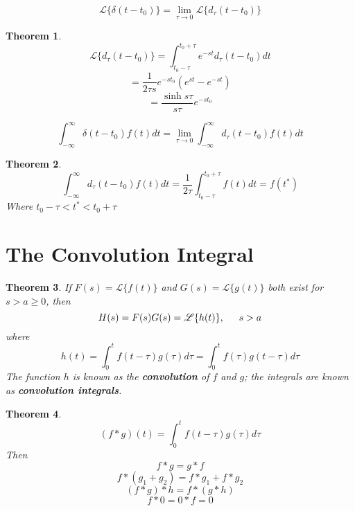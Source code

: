 \documentclass[letter]{article}
\newcommand{\laplace}[1]{\mathscr{L}\{#1\}}
\newtheorem{theorem}{Theorem}[section]
\newenvironment{definition}[1][Definition]{\begin{trivlist}
\item[\hskip \labelsep {\bfseries #1}]}{\end{trivlist}}
\begin{document}
\begin{definition}
\[\laplace{\delta(t-t_0)} = \lim_{\tau\to 0} \laplace{d_\tau (t-t_0)} \]
\end{definition}

\begin{theorem}
\[\laplace{d_\tau (t-t_0)} = \int_{t_0-\tau}^{t_0+\tau} e^{-st}d_\tau(t-t_0) dt \]
\[ = \frac{1}{2\tau s} e^{-st_0} (e^{st} - e ^{-st}) \]
\[=\frac{\sinh s\tau}{s\tau} e^{-st_0}\]
\end{theorem}

\begin{definition}
\[\int_{-\infty}^{\infty} \delta(t-t_0) f(t) dt = \lim_{\tau\to 0} \int_{-\infty}^{\infty} d_\tau(t-t_0) f(t) dt\]
\end{definition}

\begin{theorem}
\[ \int_{-\infty}^{\infty} d_\tau(t-t_0) f(t) dt = \frac{1}{2\tau}\int_{t_0-\tau}^{t_0+\tau} f(t) dt = f(t^*)\]
Where $t_0-\tau<t^*<t_0+\tau$
\end{theorem}

\section{The Convolution Integral}
\begin{theorem}
If $F(s) = \laplace{f(t)}$ and $G(s) = \laplace{g(t)}$ both exist for $s>a\geq 0$, then
\[H(s) = F(s)G(s) = \laplace{h(t)}, \indent s>a \]
where
\[ h(t) = \int_0^t f(t-\tau)g(\tau) d\tau = \int_0^t f(\tau)g(t-\tau) d\tau \] 
The function $h$ is known as the \textbf{convolution} of $f$ and $g$; the integrals are known as \textbf{convolution integrals}.
\end{theorem}

\begin{theorem}
\[(f * g)(t) = \int_0^t f(t-\tau)g(\tau) d\tau\]
Then
\[f*g = g*f\]
\[f*(g_1+g_2) = f*g_1 + f*g_2\]
\[(f*g)*h = f*(g*h)\]
\[f*0 = 0*f = 0\]
\end{theorem}
\end{document}
